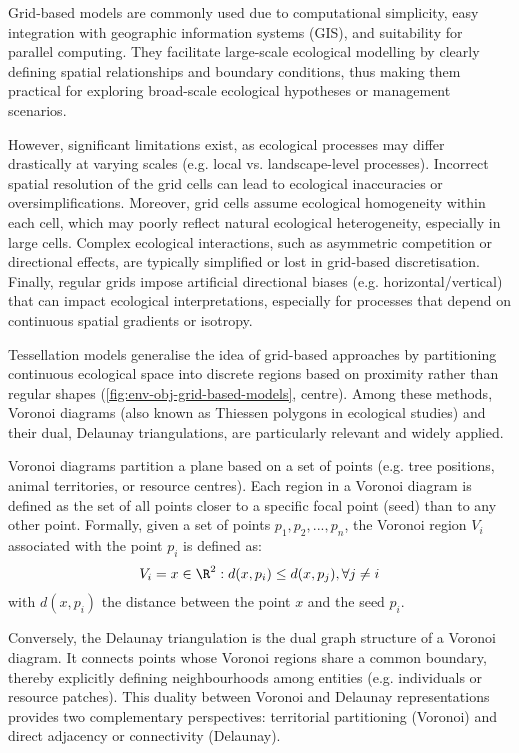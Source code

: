 Grid-based models are commonly used due to computational simplicity, easy integration with geographic information systems (GIS), and suitability for parallel computing. They facilitate large-scale ecological modelling by clearly defining spatial relationships and boundary conditions, thus making them practical for exploring broad-scale ecological hypotheses or management scenarios.

However, significant limitations exist, as ecological processes may differ drastically at varying scales (e.g. local vs. landscape-level processes). Incorrect spatial resolution of the grid cells can lead to ecological inaccuracies or oversimplifications. Moreover, grid cells assume ecological homogeneity within each cell, which may poorly reflect natural ecological heterogeneity, especially in large cells. Complex ecological interactions, such as asymmetric competition or directional effects, are typically simplified or lost in grid-based discretisation. Finally, regular grids impose artificial directional biases (e.g. horizontal/vertical) that can impact ecological interpretations, especially for processes that depend on continuous spatial gradients or isotropy.


Tessellation models generalise the idea of grid-based approaches by partitioning continuous ecological space into discrete regions based on proximity rather than regular shapes (\cref{fig:env-obj-grid-based-models}, centre). Among these methods, Voronoi diagrams (also known as Thiessen polygons in ecological studies) and their dual, Delaunay triangulations, are particularly relevant and widely applied.

Voronoi diagrams partition a plane based on a set of points (e.g. tree positions, animal territories, or resource centres). Each region in a Voronoi diagram is defined as the set of all points closer to a specific focal point (seed) than to any other point. Formally, given a set of points ${p_1, p_2, ..., p_n}$, the Voronoi region $V_i$ associated with the point $p_i$ is defined as:
\begin{align}
V_i = { x \in \R^2 : d(x, p_i) \leq d(x, p_j), \forall j \neq i }
\end{align}
with $d(x, p_i)$ the distance between the point $x$ and the seed $p_i$.

Conversely, the Delaunay triangulation is the dual graph structure of a Voronoi diagram. It connects points whose Voronoi regions share a common boundary, thereby explicitly defining neighbourhoods among entities (e.g. individuals or resource patches). This duality between Voronoi and Delaunay representations provides two complementary perspectives: territorial partitioning (Voronoi) and direct adjacency or connectivity (Delaunay).

